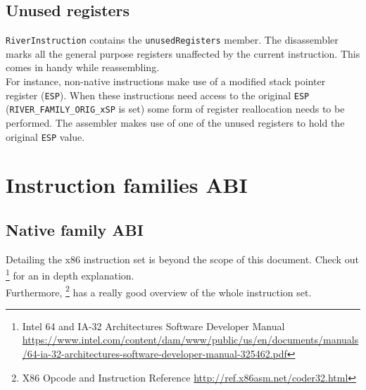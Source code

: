 \documentclass[12pt]{report}
\begin{document}
\section{Unused registers}
\label{sec:unused-register}
\texttt{RiverInstruction} contains the \texttt{unusedRegisters} member. The disassembler marks all the general purpose registers unaffected by the current instruction. This comes in handy while reassembling.\\
\newline
For instance, non-native instructions make use of a modified stack pointer register (\texttt{ESP}). When these instructions need access to the original \texttt{ESP} (\texttt{RIVER_FAMILY_ORIG_xSP} is set) some form of register reallocation needs to be performed. The assembler makes use of one of the unused registers to hold the original \texttt{ESP} value.\\

\chapter{Instruction families ABI}
\label{chapter:instruction-families-abi}
\section{Native family ABI}
\label{sec:native-family-abi}
Detailing the x86 instruction set is beyond the scope of this document. Check out \footnote{Intel 64 and IA-32 Architectures Software Developer Manual \url{https://www.intel.com/content/dam/www/public/us/en/documents/manuals/64-ia-32-architectures-software-developer-manual-325462.pdf}} for an in depth explanation.\\
\newline
Furthermore, \footnote{X86 Opcode and Instruction Reference \url{http://ref.x86asm.net/coder32.html}} has a really good overview of the whole instruction set.\\
\end{document}
